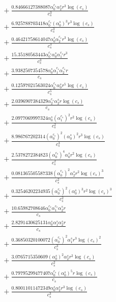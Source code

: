\documentclass[10pt]{article}
\begin{document}
\begin{align*}
&{}  + \frac{0.84666127388087 \alpha_{0}^{c_s} \alpha_{2}^s r^{3} \log{\left(c_{s} \right)}}{c_{s}^{3}} \\
&{}  + \frac{6.925788703418 \alpha_{0}^{c_s} \left(\alpha_{0}^s\right)^{3} r^{3} \log{\left(c_{s} \right)}}{c_{s}^{3}} \\
&{}  + \frac{0.46421758614047 \alpha_{0}^s \alpha_{2}^{c_s} r^{3} \log{\left(c_{s} \right)}}{c_{s}^{3}} \\
&{}  + \frac{15.35180563443 \alpha_{0}^{c_s} \alpha_{0}^s \alpha_{1}^{c_s} r^{3}}{c_{s}^{3}} \\
&{}  + \frac{3.9382507354578 \alpha_{0}^s \alpha_{1}^{c_s} \alpha_{2}^{c_s} r}{c_{s}} \\
&{}  + \frac{0.12597021563024 \alpha_{0}^{c_s} \alpha_{0}^s r^{5} \log{\left(c_{s} \right)}}{c_{s}^{5}} \\
&{}  + \frac{2.0396907384329 \alpha_{2}^{c_s} \alpha_{2}^s r \log{\left(c_{s} \right)}}{c_{s}} \\
&{}  + \frac{2.0977069997324 \alpha_{0}^s \left(\alpha_{1}^{c_s}\right)^{2} r^{2} \log{\left(c_{s} \right)}}{c_{s}^{2}} \\
&{}  + \frac{8.986767202314 \left(\alpha_{0}^{c_s}\right)^{2} \left(\alpha_{0}^s\right)^{2} r^{3} \log{\left(c_{s} \right)}}{c_{s}^{3}} \\
&{}  + \frac{2.5378272384823 \left(\alpha_{0}^{c_s}\right)^{4} \alpha_{0}^s r^{2} \log{\left(c_{s} \right)}}{c_{s}^{2}} \\
&{}  + \frac{0.081365505587338 \left(\alpha_{0}^{c_s}\right)^{2} \alpha_{2}^s r^{2} \log{\left(c_{s} \right)}^{3}}{c_{s}^{2}} \\
&{}  + \frac{0.32546202234935 \left(\alpha_{0}^{c_s}\right)^{2} \left(\alpha_{0}^s\right)^{3} r^{2} \log{\left(c_{s} \right)}^{3}}{c_{s}^{2}} \\
&{}  + \frac{10.65982708646 \alpha_{0}^{c_s} \alpha_{1}^{c_s} \alpha_{2}^s r}{c_{s}} \\
&{}  + \frac{2.8291430625131 \alpha_{0}^s \alpha_{1}^s \alpha_{2}^s r}{c_{s}} \\
&{}  + \frac{0.36850320100072 \left(\alpha_{0}^{c_s}\right)^{2} \alpha_{1}^s r^{3} \log{\left(c_{s} \right)}^{2}}{c_{s}^{3}} \\
&{}  + \frac{3.0765715350609 \left(\alpha_{0}^s\right)^{2} \alpha_{2}^s r^{2} \log{\left(c_{s} \right)}}{c_{s}^{2}} \\
&{}  + \frac{0.79795299477407 \alpha_{0}^{c_s} \left(\alpha_{0}^s\right)^{5} r \log{\left(c_{s} \right)}}{c_{s}} \\
&{}  + \frac{0.80011011472349 \alpha_{0}^s \alpha_{2}^s r^{3} \log{\left(c_{s} \right)}}{c_{s}^{3}} \\

\end{align*}
\end{document}
